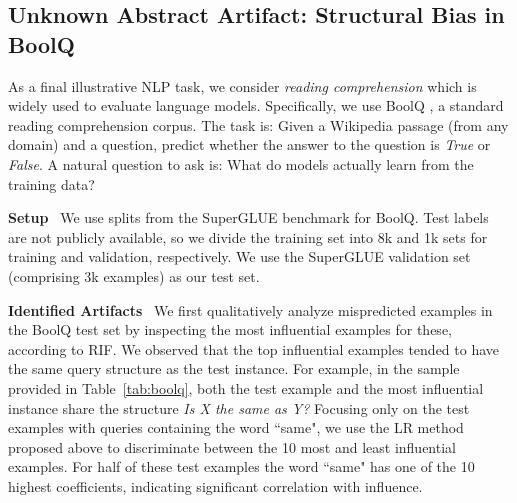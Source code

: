 \documentclass[11pt]{article}
\newcommand\para[1]{\vskip 1mm\noindent\textbf{#1}~}
\begin{document}
\begin{comment}
\begin{subfigure}[b]{\columnwidth} 
  \centering
            \begin{tabular}{lcc}
            \toprule
            &\bf Married&\bf Child\\
            \midrule
            Orig&90.4&100.0\\
            Rand&43.6&34.8\\
            RIF+G&\bf 41.9& \bf 30.4\\
            \bottomrule
            \end{tabular}
            \caption{Effect of adverserially modifying entities' mention by adding same location at the end of subject and object mentions on the accuracy of triple classification task.} 
            \label{tab:trip-acc}
        \end{subfigure}
     \caption{Investigating existing artifacts in triple classification on YAGO3-10 benchmark.}
    \postspace{}
\end{table}
\end{comment}

\subsection{Unknown Abstract Artifact: Structural Bias in BoolQ}

As a final illustrative NLP task, we consider \emph{reading comprehension} which is %
widely used to evaluate language models. 
Specifically, we use
BoolQ \cite{clark2019boolq}, a standard reading comprehension corpus. 
The task is: Given a Wikipedia passage (from any domain) and a question, predict whether the answer to the question is \emph{True} or \emph{False}. 
A natural question to ask is: What do models actually learn from the training data?

\para{Setup} We use splits from the SuperGLUE \citep{wang2019superglue} benchmark for BoolQ. 
Test labels are not publicly available, so we divide the training set into 8k and 1k sets for training and validation, respectively. 
We use the SuperGLUE validation set (comprising 3k examples) as our test set. 

\para{Identified Artifacts} We first qualitatively analyze mispredicted examples in the BoolQ test set by inspecting the most influential examples for these, according to RIF. 
We observed that the top influential examples tended to have the same query structure as the test instance. 
For example, in the sample provided in Table~\ref{tab:boolq}, both the test example and the most influential instance share the structure \emph{Is \emph{X} the same as \emph{Y}?}
Focusing only on the test examples with queries containing the word ``same", we use the LR method proposed above to discriminate between the 10 most and least influential examples. 
For half of these test examples the word ``same" has one of the 10 highest coefficients, indicating significant correlation with influence.
\end{document}
